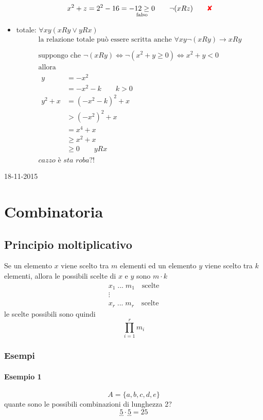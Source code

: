 \documentclass[italian]{article}
\newcommand{\crossmark}{\textcolor{red}{\text{$\qquad$\ding{56}}}}
\newcommand{\rtext}[1]{\hfill #1 \\}
\begin{document}
\begin{itemize}
\begin{gather*}
			x^2 + z = 2^2 - 16 = \underset{\text{falso}}{-12 \geq 0} \qquad \lnot(xRz) \crossmark\\
		\end{gather*}
	\item totale: $\forall xy (xRy \lor yRx)$
		\begin{gather*}
			\text{la relazione totale può essere scritta anche } \forall xy \lnot(xRy) \to xRy \\\\
			\text{suppongo che } \lnot(xRy) \Leftrightarrow \lnot(x^2 + y \geq 0) \Leftrightarrow x^2 + y < 0\\
			\text{allora}\\
			\begin{split}
				y &= -x^2 \\
				&= -x^2 - k \qquad k>0\\
				y^2 + x&= (-x^2 - k)^2 + x \\
				&> (-x^2)^2 + x \\
				&= x^4 + x \\
				&\geq x^2 + x \\
				&\geq 0 \qquad yRx
			\end{split}\\
			\textit{cazzo è sta roba?!}
		\end{gather*}
\end{itemize}
\newpage
\rtext{18-11-2015}
\section{Combinatoria}
\subsection{Principio moltiplicativo}
Se un elemento $x$ viene scelto tra $m$ elementi ed un elemento $y$ viene scelto tra $k$ elementi, allora le possibili scelte di $x$ e $y$ sono $m\cdot k$
\begin{gather*}
	x_1 \; ... \; m_1 \quad \text{scelte} \\
	\vdots \\
	x_r \; ... \; m_r \quad \text{scelte}
\end{gather*}
le scelte possibili sono quindi
\[
	\prod_{i=1}^{r} m_i
\]
\subsubsection{Esempi}
\paragraph{Esempio 1}
\[
	A = \{ a,b,c,d,e \}
\]
quante sono le possibili combinazioni di lunghezza 2?
\[
	\underbracket{5}\cdot \underbracket{5} = 25
\]
\end{document}

